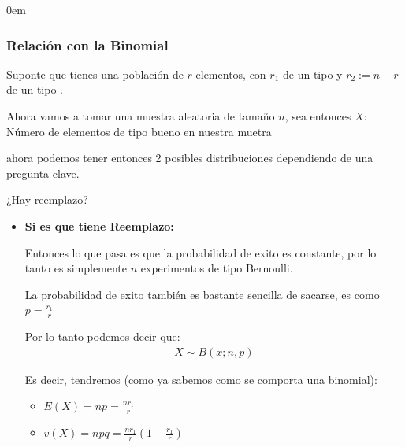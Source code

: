 \documentclass[12pt, fleqn]{report}                             %
\newenvironment{SmallIndentation}[1][0.75em]                    %
        {\begin{adjustwidth}{#1}{}\begin{footnotesize}}             %
        {\end{footnotesize}\end{adjustwidth}}                       %
\newcommand \Quote {\qq}                                        %
\theoremstyle{break}                                            %
\newcommand{\Wrap}[1]{\left( #1 \right)}                        %
\begin{document}
                \begin{multicols*}{2}
                \begin{SmallIndentation}[0em]

                    \subsubsection{Relación con la Binomial}

                        Suponte que tienes una población de $r$ elementos, con $r_1$ de un tipo \Quote{bueno}
                        y $r_2 := n - r$ de un tipo \Quote{malo}.

                        Ahora vamos a tomar una muestra aleatoria de tamaño $n$,
                        sea entonces $X : $ Número de elementos de tipo bueno en nuestra muetra 

                        ahora podemos tener
                        entonces 2 posibles distribuciones dependiendo de una pregunta clave.

                        ¿Hay reemplazo?

                        \begin{itemize}
                            \item 
                                \textbf{Si es que tiene Reemplazo:}

                                Entonces lo que pasa es que la probabilidad de exito es constante, por 
                                lo tanto es simplemente $n$ experimentos de tipo Bernoulli.

                                La probabilidad de exito también es bastante sencilla de sacarse, es
                                como $p = \frac{r_1}{r}$

                                Por lo tanto podemos decir que:
                                \begin{align*}
                                    X \sim B(x; n, p)
                                \end{align*}

                                Es decir, tendremos (como ya sabemos como se comporta una binomial):
                                \begin{itemize}
                                    \item $E(X) = np = \frac{nr_1}{r}$
                                    \item $v(X) = npq = \frac{nr_1}{r}\Wrap{1 - \frac{r_1}{r}}$
                                \end{itemize}


\end{itemize}
\end{SmallIndentation}
\end{multicols*}
\end{document}
